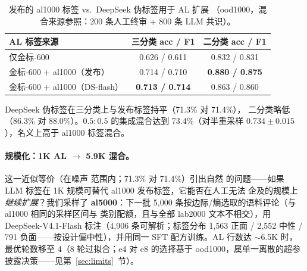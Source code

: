 \documentclass[11pt,a4paper]{article}
\begin{document}
\begin{table}[H]
\centering\small
\caption{发布的 al1000 标签 vs.\ DeepSeek 伪标签用于 AL 扩展
（ood1000，混合来源参照：200 条人工终审 + 800 条 LLM 共识）。}
\label{tab:ds-teacher}
\begin{tabular}{lcc}
\toprule
AL 标签来源 & 三分类 acc / F1 & 二分类 acc / F1 \\
\midrule
仅金标-600                & 0.626 / 0.611 & 0.832 / 0.831 \\
金标-600 + al1000（发布）    & 0.714 / 0.710 & \textbf{0.880 / 0.875} \\
金标-600 + al1000（DS-flash） & \textbf{0.713 / 0.714} & 0.863 / 0.860 \\
\bottomrule
\end{tabular}
\end{table}

DeepSeek 伪标签在三分类上与发布标签持平（71.3\% 对 71.4\%），
二分类略低（86.3\% 对 88.0\%）。$0.5{:}0.5$ 的集成混合达到
73.4\%（对半重采样 $0.734 \pm 0.015$），名义上高于 al1000 标签混合。

\paragraph{规模化：1K AL $\to$ 5.9K 混合。} 这一近似等价（在噪声
范围内；71.3\% 对 71.4\%）引出自然
的问题——如果 LLM 标签在 1K 规模可替代 al1000 发布标签，它能否在人工无法
企及的规模上\emph{继续扩展}？我们采样了 \textbf{al5000}：下一批
5{,}000 条按边际/熵选取的语料评论（与 al1000 相同的采样区间与
类别配额，且与全部 lab2000 文本不相交），用 DeepSeek-V4.1-Flash
标注（4{,}906 条可解析；标签分布 1{,}563 正面 / 2{,}552 中性 /
791 负面——按设计偏中性），并用同一 SFT 配方训练。AL 行数达
$\sim$6.5K 时，最优轮数移至 4（8 轮过拟合；e4 对 e8 的选择基于
ood1000，属单一离散的超参披露决策——见第~\ref{sec:limits}~节）。
\end{document}
